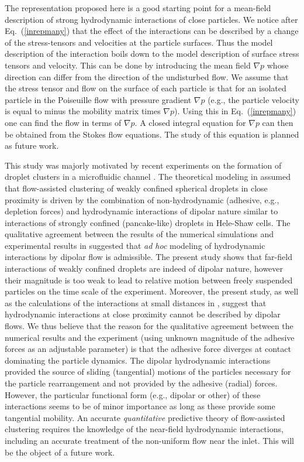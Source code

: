 The representation proposed here is a good starting point for a mean-field description of strong hydrodynamic interactions of close particles. We notice after Eq.~(\ref{inrepmany}) that the effect of the interactions can be described by a  change of the stress-tensors and velocities at the particle surfaces. Thus the model description of the interaction boils down to the model description of surface stress tensors and velocity. This can be done by introducing the mean field $\nabla p$ whose direction can differ from the direction of the undisturbed flow. We assume that the stress tensor and flow on the surface of each particle is that for an isolated particle in the Poiseuille flow with pressure gradient $\nabla p$ (e.g., the particle velocity is equal to minus the mobility matrix times $\nabla p$). Using this in Eq.~(\ref{inrepmany}) one can find the flow in terms of $\nabla p$. A closed integral equation for $\nabla p$ can then be obtained from the Stokes flow equations. The study of this equation is planned as future work.

This study was majorly motivated by recent experiments on the formation of droplet clusters in a microfluidic channel \cite{tab0,tabeling}. The theoretical modeling in \cite{tabeling} assumed that flow-assisted clustering of weakly confined spherical droplets in close proximity is driven  by the combination of non-hydrodynamic (adhesive, e.g., depletion forces) and hydrodynamic interactions of dipolar nature similar to interactions of strongly confined (pancake-like) droplets in Hele-Shaw cells. The qualitative agreement between the results of the numerical simulations and experimental results in \cite{tabeling} suggested that \emph{ad hoc} modeling of hydrodynamic interactions by dipolar flow is admissible. The present study shows that far-field interactions of weakly confined droplets are indeed of dipolar nature, however their magnitude is too weak to lead to relative motion between freely suspended particles on the time scale of the experiment. Moreover, the present study, as well as the calculations of the interactions at small distances in \cite{tl2012,is}, suggest that hydrodynamic interactions  at close proximity cannot be described by dipolar flows. We thus believe that the reason for the qualitative agreement between the numerical results and the experiment (using unknown magnitude of the adhesive forces as an adjustable parameter) is that the adhesive force diverges at contact dominating the particle dynamics. The dipolar hydrodynamic interactions provided the source of sliding (tangential) motions of the particles necessary for the particle rearrangement and not provided by the adhesive (radial) forces. However, the particular functional form (e.g., dipolar or other) of these interactions seems to be of minor importance as long as these provide some tangential mobility. An accurate \emph{quantitative} predictive theory of flow-assisted clustering requires the knowledge of the near-field hydrodynamic interactions, including an accurate treatment of the non-uniform flow near the inlet. This will be the object of a future work.



